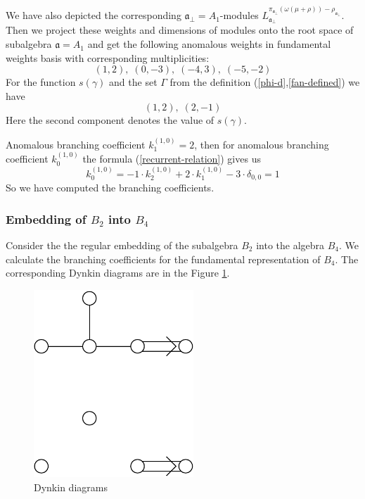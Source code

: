 \documentclass[a4paper,12pt]{article}
\theoremstyle{definition} \newtheorem{Def}{Definition}
\begin{document}
We have also depicted the corresponding $\mathfrak{a}_{\bot}=A_1$-modules $L^{\pi_{\mathfrak{a}_{\bot}}(\omega(\mu+\rho))-\rho_{\mathfrak{a}_{\bot}}}_{\mathfrak{a}_{\bot}}$.
Then we project these weights and dimensions of modules onto the root space of subalgebra $\mathfrak{a}=A_1$ and get the following anomalous weights in fundamental weights basis with corresponding multiplicities:
\begin{equation}
  \label{eq:25}
  (1,2),\; (0,-3),\; (-4,3),\; (-5,-2)
\end{equation}
For the function $s(\gamma)$ and the set $\Gamma$ from the definition (\ref{phi-d},\ref{fan-defined}) we have
\begin{equation}
  \label{eq:22}
  (1,2),\; (2,-1)
\end{equation}
Here the second component denotes the value of $s(\gamma)$.

Anomalous branching coefficient $k^{(1,0)}_{1}=2$, then for anomalous branching coefficient $k^{(1,0)}_{0}$ the formula (\ref{recurrent-relation}) gives us
\begin{equation}
  \label{eq:23}
  k^{(1,0)}_{0}=-1\cdot k^{(1,0)}_2 +2\cdot k^{(1,0)}_1 - 3\cdot \delta_{0,0} = 1
\end{equation}
So we have computed the branching coefficients.

\subsubsection{Embedding of $B_2$ into $B_4$}
\label{sec:someth-high-dimens}
Consider the the regular embedding of the subalgebra $B_2$ into the algebra $B_4$.
We calculate the branching coefficients for the fundamental representation of $B_4$.
The corresponding Dynkin diagrams are in the Figure \ref{fig:dynkin}.
\begin{figure}[ph]
  \centering
  \includegraphics[width=60mm]{B4_B2_2A1.pdf}
  \caption{Dynkin diagrams}
  \label{fig:dynkin}
\end{figure}
\end{document}
